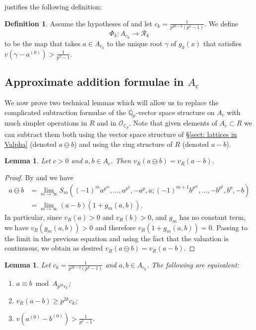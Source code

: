 \documentclass{amsart}
\newtheorem{lemma}[theorem]{Lemma}
\theoremstyle{definition}
\newtheorem{definition}[theorem]{Definition}
\numberwithin{theorem}{section}
\numberwithin{equation}{section}
\begin{document}
 justifies the following definition:
\begin{definition}\label{def: map Phi}
Assume the hypotheses of  and let $c_k =\frac{1}{p^{2k-2}(p^2-1)}$. We define
\[
\Phi_k : A_{c_k} \to \mathcal{R}_k
\]
to be the map that takes $a \in A_{c_k}$ to the unique root $\gamma$ of $g_k(x)$ that satisfies $v(\gamma - a^{(0)}) > \frac{1}{p^2-1}$.
\end{definition}

\subsection{Approximate addition formulae in $A_c$}

We now prove two technical lemmas which will allow us to replace the complicated subtraction formulae of the $\mathbb{Q}_p$-vector space structure on $A_c$ with much simpler operations in $R$ and in $\mathcal{O}_{\mathbb{C}_p}$.  Note that given elements of $A_c \subset R$ we can subtract them both using the vector space structure of \S \ref{sect: lattices in Valpha} (denoted $a \ominus b$) and using the ring structure of $R$ (denoted $a-b$).

\begin{lemma}\label{lemma: valuations for the two differences are the same}
    Let $c>0$ and $a, b \in A_{c}$. Then $v_R(a \ominus b) = v_R(a-b).$
\end{lemma}

\begin{proof}
    By  and  we have
    \[
    \begin{aligned}
    a \ominus b & = \lim_{m \to \infty} S_m((-1)^ma^{p^m} , \ldots, a^{p^2}, -a^p, a; (-1)^{m+1}b^{p^m} , \ldots, -b^{p^2}, b^p, -b) \\
    & = \lim_{m \to \infty} (a-b)(1+g_m(a,b)).
    \end{aligned}
    \]
    In particular, since $v_R(a)>0$ and $v_R(b)>0$, and $g_m$ has no constant term, we have $v_R(g_m(a,b))>0$ and therefore $v_R(1+g_m(a,b)) = 0$. Passing to the limit in the previous equation and using the fact that the valuation is continuous, we obtain as desired $v_R(a \ominus b) = v_R(a-b)$.
\end{proof}

\begin{lemma}\label{lemma: congruence modulo Apkc}
    Let $c_k=\frac{1}{p^{2k-2}(p^2-1)}$ and $a, b \in A_{c_k}$. The following are equivalent:
    \begin{enumerate}
        \item $a \equiv b \bmod{A_{p^{2k}c_k}}$;
        \item $v_R(a - b) \geq p^{2k} c_k$;
        \item $v(a^{(0)}-b^{(0)}) > \frac{1}{p^2-1}$.
    \end{enumerate}
\end{lemma}
\end{document}
